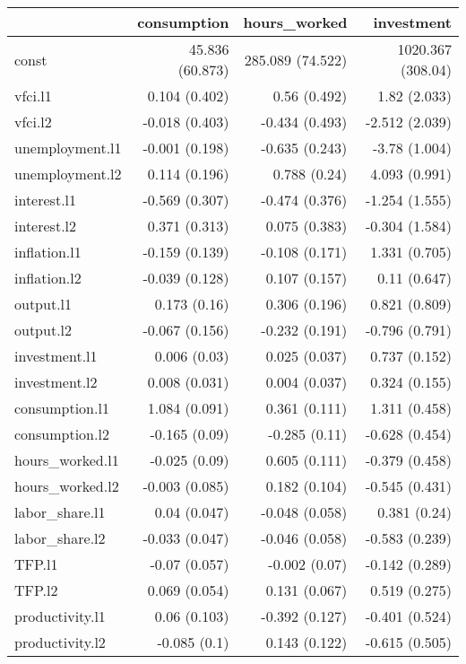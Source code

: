 \begin{longtable}{l|rrr}
\toprule
\multicolumn{1}{l}{} & consumption & hours\_worked & investment \\ 
\midrule\addlinespace[2.5pt]
const & 45.836 (60.873) & 285.089 (74.522) & 1020.367 (308.04) \\ 
vfci.l1 & 0.104 (0.402) & 0.56 (0.492) & 1.82 (2.033) \\ 
vfci.l2 & -0.018 (0.403) & -0.434 (0.493) & -2.512 (2.039) \\ 
unemployment.l1 & -0.001 (0.198) & -0.635 (0.243) & -3.78 (1.004) \\ 
unemployment.l2 & 0.114 (0.196) & 0.788 (0.24) & 4.093 (0.991) \\ 
interest.l1 & -0.569 (0.307) & -0.474 (0.376) & -1.254 (1.555) \\ 
interest.l2 & 0.371 (0.313) & 0.075 (0.383) & -0.304 (1.584) \\ 
inflation.l1 & -0.159 (0.139) & -0.108 (0.171) & 1.331 (0.705) \\ 
inflation.l2 & -0.039 (0.128) & 0.107 (0.157) & 0.11 (0.647) \\ 
output.l1 & 0.173 (0.16) & 0.306 (0.196) & 0.821 (0.809) \\ 
output.l2 & -0.067 (0.156) & -0.232 (0.191) & -0.796 (0.791) \\ 
investment.l1 & 0.006 (0.03) & 0.025 (0.037) & 0.737 (0.152) \\ 
investment.l2 & 0.008 (0.031) & 0.004 (0.037) & 0.324 (0.155) \\ 
consumption.l1 & 1.084 (0.091) & 0.361 (0.111) & 1.311 (0.458) \\ 
consumption.l2 & -0.165 (0.09) & -0.285 (0.11) & -0.628 (0.454) \\ 
hours\_worked.l1 & -0.025 (0.09) & 0.605 (0.111) & -0.379 (0.458) \\ 
hours\_worked.l2 & -0.003 (0.085) & 0.182 (0.104) & -0.545 (0.431) \\ 
labor\_share.l1 & 0.04 (0.047) & -0.048 (0.058) & 0.381 (0.24) \\ 
labor\_share.l2 & -0.033 (0.047) & -0.046 (0.058) & -0.583 (0.239) \\ 
TFP.l1 & -0.07 (0.057) & -0.002 (0.07) & -0.142 (0.289) \\ 
TFP.l2 & 0.069 (0.054) & 0.131 (0.067) & 0.519 (0.275) \\ 
productivity.l1 & 0.06 (0.103) & -0.392 (0.127) & -0.401 (0.524) \\ 
productivity.l2 & -0.085 (0.1) & 0.143 (0.122) & -0.615 (0.505) \\ 
\bottomrule
\end{longtable}
